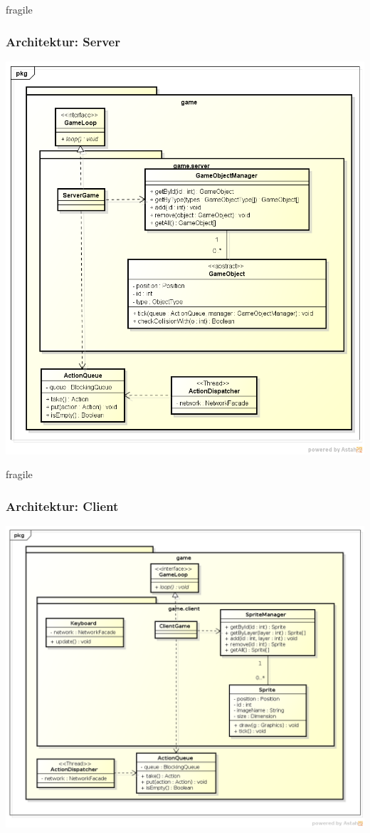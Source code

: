 \documentclass[10pt, compress]{beamer}
\begin{document}
\begin{frame}{fragile}
	\frametitle{Architektur: Server}
	\begin{center}
	\includegraphics[scale=0.3]{ClassDiagramGameServer}
	\end{center}
\end{frame}

\begin{frame}{fragile}
	\frametitle{Architektur: Client}
	\begin{center}
	\includegraphics[scale=0.3]{ClassDiagramGameClient}
	\end{center}
\end{frame}
\end{document}

